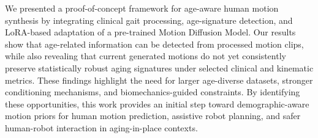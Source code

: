 We presented a proof-of-concept framework for age-aware human motion synthesis by integrating clinical gait processing, age-signature detection, and LoRA-based adaptation of a pre-trained Motion Diffusion Model.
Our results show that age-related information can be detected from processed motion clips, while also revealing that current generated motions do not yet consistently preserve statistically robust aging signatures under selected clinical and kinematic metrics.
These findings highlight the need for larger age-diverse datasets, stronger conditioning mechanisms, and biomechanics-guided constraints.
By identifying these opportunities, this work provides an initial step toward demographic-aware motion priors for human motion prediction, assistive robot planning, and safer human-robot interaction in aging-in-place contexts.

